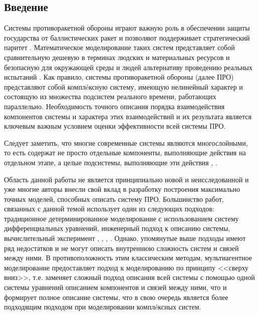 \newpage
\parindent=1cm %
\begin{center}
	\section*{Введение} %
	\pagestyle{plain} %
	\setcounter{page}{3} %
\end{center}


Системы противоракетной обороны играют важную роль в обеспечении защиты государства от баллистических ракет и позволяют поддерживает стратегический паритет \cite{Handber:2015}. Математическое моделирование таких систем представляет собой сравнительную дешевую в терминах людских и материальных ресурсов и безопасную для окружающей среды и людей альтернативу проведению реальных испытаний \cite{Marshall:2013}. Как правило, системы противоракетной обороны (далее ПРО) представляют собой компл\'eксную систему, имеющую нелинейный характер и состоящую из множества подсистем реального времени, работающих параллельно. Необходимость точного описания порядка взаимодействия компонентов системы и характера этих взаимодействий и их результата является ключевым важным условием оценки эффективности всей системы ПРО.

Следует заметить, что многие современные системы являются многослойными, то есть содержат не просто отдельные компоненты, выполняющие действия на отдельном этапе, а целые подсистемы, выполняющие эти действия \cite{Ganguly:2014}, \cite{Nguyen:2014}. 

Область данной работы не является принципиально новой и неисследованной и уже многие авторы внесли свой вклад в разработку построения максимально точных моделей, способных описать систему ПРО. Большинство работ, связанных с данной темой использует один из следующих подходов: традиционное детерминированное моделирование с использованием систему дифференциальных уравнений, инженерный подход к описанию системы, вычислительный эксперимент \cite{Nguyen:2014}, \cite{Armstrong:2014}, \cite{Sommerer:2012}, \cite{Cheng:2015}. Однако, упомянутые выше подходы имеют ряд недостатков и не могут описать внутреннюю сложность систем и связей между ними. В противоположность этим классическим методам, мультиагентное моделирование предоставляет подход к моделированию по принципу <<сверху вниз>>, т.е. заменяет сложный подход описания всей системы с помощью одной системы уравнений описанием компонентов и связей между ними, что и формирует полное описание системы, что в свою очередь является более подходящим подходом при моделировании компл\'eксных систем.

